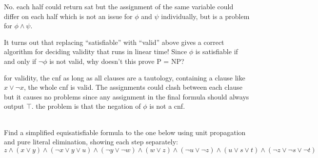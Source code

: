\documentclass[11pt]{article}
\begin{document}
\begin{qunlist}
\begin{qparts}
    \begin{answer}
      No. each half could return sat but the assignment of the same variable could differ on each half which is not an issue for \(\phi\) and \(\psi\) individually, but is a problem for \(\phi\land \psi\).
    \end{answer}

  \item
    It turns out that replacing ``satisfiable'' with ``valid'' above gives a correct algorithm for deciding validity that runs in linear time!
    Since $\phi$ is satisfiable if and only if $\lnot \phi$ is not valid, why doesn't this prove P = NP?

    \begin{answer}
      for validity, the cnf as long as all clauses are a tautology, containing a clause like \(x\lor \neg x\), the whole cnf is valid. The assignments could clash between each clause but it causes no problems since any assignment in the final formula should always output \(\top\). the problem is that the negation of \(\phi\) is not a cnf.
    \end{answer}
  \end{qparts}


  \\
  Find a simplified equisatisfiable formula to the one below using unit propagation and pure literal elimination, showing each step separately:
  \[
    z \land (x \lor y) \land (\lnot x \lor y \lor u) \land (\lnot y \lor \lnot w) \land (w \lor z) \land (\lnot u \lor \lnot z) \land (u \lor s \lor t) \land (\lnot z \lor \lnot s \lor \lnot t)
  \]


\end{qunlist}
\end{document}
